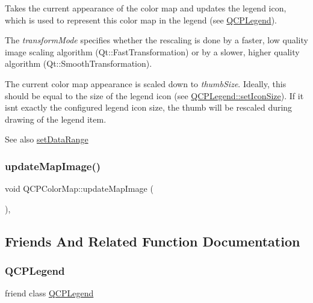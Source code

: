 Takes the current appearance of the color map and updates the legend icon, which is used to represent this color map in the legend (see \mbox{\hyperlink{class_q_c_p_legend}{Q\+C\+P\+Legend}}).

The {\itshape transform\+Mode} specifies whether the rescaling is done by a faster, low quality image scaling algorithm (Qt\+::\+Fast\+Transformation) or by a slower, higher quality algorithm (Qt\+::\+Smooth\+Transformation).

The current color map appearance is scaled down to {\itshape thumb\+Size}. Ideally, this should be equal to the size of the legend icon (see \mbox{\hyperlink{class_q_c_p_legend_a8b0740cce488bf7010da6beda6898984}{Q\+C\+P\+Legend\+::set\+Icon\+Size}}). If it isn\textquotesingle{}t exactly the configured legend icon size, the thumb will be rescaled during drawing of the legend item.

\begin{DoxySeeAlso}{See also}
\mbox{\hyperlink{class_q_c_p_color_map_a980b42837821159786a85b4b7dcb8774}{set\+Data\+Range}} 
\end{DoxySeeAlso}
\mbox{\label{class_q_c_p_color_map_a5efcea591bb5486d968af520a4d43c3a}} 
\subsubsection{\texorpdfstring{updateMapImage()}{updateMapImage()}}
{\footnotesize\ttfamily void Q\+C\+P\+Color\+Map\+::update\+Map\+Image (\begin{DoxyParamCaption}{ }\end{DoxyParamCaption})\hspace{0.3cm}{\ttfamily [protected]}, {\ttfamily [virtual]}}



\subsection{Friends And Related Function Documentation}
\mbox{\label{class_q_c_p_color_map_a8429035e7adfbd7f05805a6530ad5e3b}} 
\subsubsection{\texorpdfstring{QCPLegend}{QCPLegend}}
{\footnotesize\ttfamily friend class \mbox{\hyperlink{class_q_c_p_legend}{Q\+C\+P\+Legend}}\hspace{0.3cm}{\ttfamily [friend]}}

